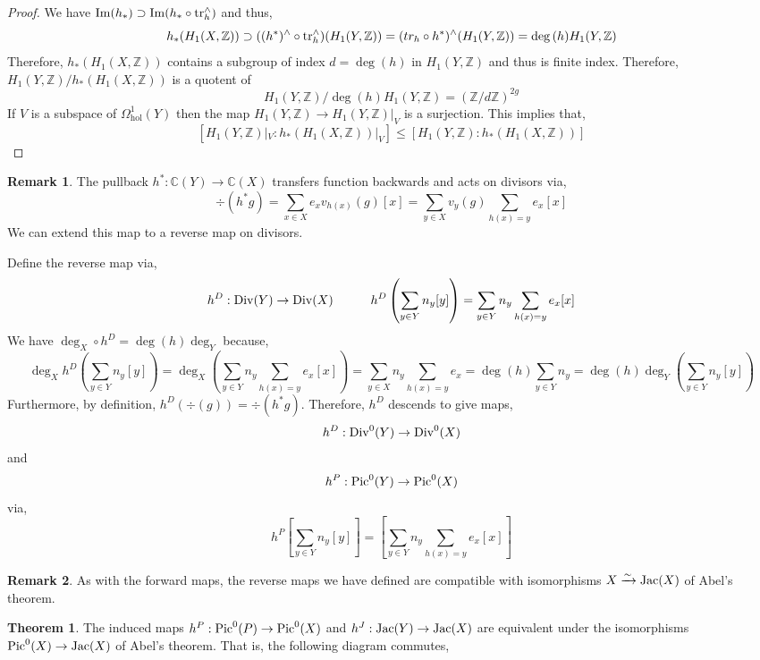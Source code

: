 \documentclass{article}
\newcommand{\Z}{\mathbb{Z}}
\newcommand{\C}{\mathbb{C}}
\renewcommand{\Im}[1]{\mathrm{Im}(#1)}
\theoremstyle{definition}
\newtheorem{theorem}{Theorem}[section]
\newtheorem{remark}{Remark}[section]
\newenvironment{definition}[1][Definition:]{\begin{trivlist}
\item[\hskip \labelsep {\bfseries #1}]}{\end{trivlist}}
\begin{document}
\begin{proof}
We have $\Im{h_*} \supset \Im{h_* \circ \tr_h^\wedge}$ and thus,
\[ h_*(H_1(X, \Z)) \supset ((h^*)^\wedge \circ \tr_h^\wedge)(H_1(Y, \Z)) = (tr_h \circ h^*)^\wedge(H_1(Y, \Z)) = \deg{(h)} H_1(Y, \Z) \]
Therefore, $h_*(H_1(X, \Z))$ contains a subgroup of index $d = \deg{(h)}$ in $H_1(Y, \Z)$ and thus is finite index. Therefore, $H_1(Y, \Z) / h_*(H_1(X, \Z))$ is a quotent of \[ H_1(Y, \Z) / \deg{(h)} H_1(Y, \Z) = (\Z / d \Z)^{2g} \]
If $V$ is a subspace of $\Omega^1_{\text{hol}}(Y)$ then the map $H_1(Y, \Z) \to H_1(Y, \Z)|_V$ is a surjection. This implies that,
\[ [ H_1(Y, \Z)|_V :  h_*(H_1(X, \Z))|_V ] \le   [H_1(Y,\Z) : h_*(H_1(X, \Z))] \]
\end{proof}

\begin{remark}
The pullback $h^* : \C(Y) \to \C(X)$ transfers function backwards and acts on divisors via,
\[ \div(h^* g) = \sum_{x \in X} e_x v_{h(x)}(g) [x] = \sum_{y \in X} v_y(g) \sum_{h(x) = y} e_x [x] \]
We can extend this map to a reverse map on divisors.
\end{remark}

\begin{definition}
Define the reverse map via,
\[ h^D : \mathrm{Div}(Y) \to \mathrm{Div}(X) \quad \quad \quad h^D \left( \sum_{y \in Y} n_y [y] \right) =\sum_{y \in Y} n_y \sum_{h(x) = y} e_x [x] \]
We have $\deg_X \circ h^D = \deg{(h)} \deg_Y$ because,
\[ \deg_X{h^D \left( \sum_{y \in Y} n_y [y] \right)} = \deg_X{\left( \sum_{y \in Y} n_y \sum_{h(x) = y} e_x [x] \right)} = \sum_{y \in X} n_y \sum_{h(x) = y} e_x = \deg{(h)} \sum_{y \in Y} n_y = \deg{(h)} \deg_Y{\left( \sum_{y \in Y} n_y [y] \right)} \]
Furthermore, by definition, $h^D(\div{(g)}) = \div{(h^* g)}$. Therefore, $h^D$ descends to give maps,
\[ h^D : \mathrm{Div}^0(Y) \to \mathrm{Div}^0(X) \]
and
\[ h^P : \mathrm{Pic}^0(Y) \to \mathrm{Pic}^0(X) \]
via,
\[ h^P\left[ \sum_{y \in Y} n_y [y] \right] = \left[ \sum_{y \in Y} n_y \sum_{h(x) = y} e_x [x] \right] \]
\end{definition}

\begin{remark}
As with the forward maps, the reverse maps we have defined are compatible with isomorphisms $X \xrightarrow{\sim} \mathrm{Jac}(X)$ of Abel's theorem.
\end{remark}

\begin{theorem}
The induced maps $h^P : \mathrm{Pic}^0(P) \to \mathrm{Pic}^0(X)$ and $h^J : \mathrm{Jac}(Y) \to \mathrm{Jac}(X)$ are equivalent under the isomorphisms $\mathrm{Pic}^0(X) \to \mathrm{Jac}(X)$ of Abel's theorem. That is, the following diagram commutes,
\begin{center}
\end{center}
\end{theorem}
\end{document}
